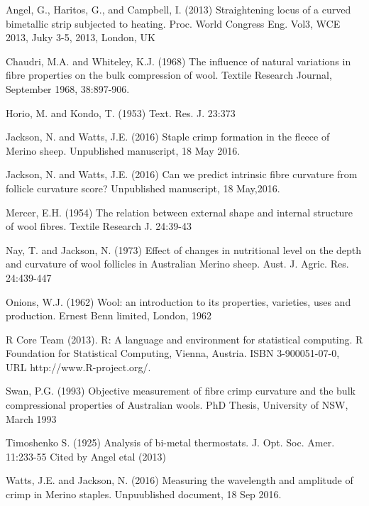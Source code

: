 \documentclass[titlepage]{article}  %
\begin{document}
\begin{thebibliography}{99}

Angel, G., Haritos, G., and Campbell, I. (2013) Straightening locus of a curved bimetallic strip subjected to heating. Proc. World Congress Eng. Vol3, WCE 2013, Juky 3-5, 2013, London, UK

Chaudri, M.A. and Whiteley, K.J. (1968) The influence of natural variations in fibre properties on the bulk compression of wool. Textile Research Journal, September 1968, 38:897-906.

Horio, M. and Kondo, T. (1953) Text. Res. J. 23:373

Jackson, N. and Watts, J.E. (2016) Staple crimp formation in the fleece of Merino sheep. Unpublished manuscript, 18 May 2016.

Jackson, N. and Watts, J.E. (2016) Can we predict intrinsic fibre curvature from follicle curvature score? Unpublished manuscript, 18 May,2016.

Mercer, E.H. (1954) The relation between external shape and internal structure of wool fibres. Textile Research J. 24:39-43

Nay, T. and Jackson, N. (1973) Effect of changes in nutritional level on the depth and curvature of wool follicles in Australian Merino sheep. Aust. J. Agric. Res. 24:439-447

Onions, W.J. (1962) Wool: an introduction to its properties, varieties, uses
     and production. Ernest Benn limited, London, 1962

R Core Team (2013). R: A language and environment for statistical
  computing. R Foundation for Statistical Computing, Vienna, Austria.
  ISBN 3-900051-07-0, URL http://www.R-project.org/.

Swan, P.G. (1993) Objective measurement of fibre crimp curvature and the bulk compressional properties of Australian wools. PhD Thesis, University of NSW, March 1993 

Timoshenko S. (1925) Analysis of bi-metal thermostats. J. Opt. Soc. Amer. 11:233-55 Cited by Angel etal (2013)~\cite{ange:13}

Watts, J.E. and Jackson, N. (2016) Measuring the wavelength and amplitude of crimp in Merino staples. Unpuublished document, 18 Sep 2016.

\end{thebibliography}
\end{document}
